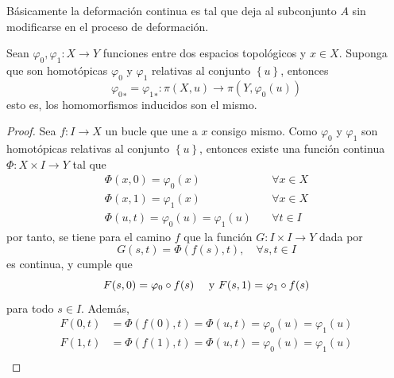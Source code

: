 \documentclass[12pt]{report}
\theoremstyle{largebreak}
\newcommand\cf[3]{\ensuremath{#1:#2\rightarrow#3}}
\begin{document}
    Básicamente la deformación continua es tal que deja al subconjunto $A$ sin modificarse en el proceso de deformación.

    \begin{theor}
        Sean $\cf{\varphi_0,\varphi_1}{X}{Y}$ funciones entre dos espacios topológicos y $x\in X$. Suponga que son homotópicas $\varphi_0$ y $\varphi_1$ relativas al conjunto $\left\{u \right\}$, entonces
        \begin{equation*}
            \cf{{\varphi_0}_*={\varphi_1}_*}{\pi(X,u)}{\pi(Y,\varphi_0(u))}
        \end{equation*}
        esto es, los homomorfismos inducidos son el mismo.
    \end{theor}

    \begin{proof}
        Sea $\cf{f}{I}{X}$ un bucle que une a $x$ consigo mismo. Como $\varphi_0$ y $\varphi_1$ son homotópicas relativas al conjunto $\left\{u\right\}$, entonces existe una función continua $\cf{\Phi}{X\times I}{Y}$ tal que
        \begin{equation*}
            \begin{split}
                \Phi(x,0)=\varphi_0(x) & \quad\forall x\in X\\
                \Phi(x,1)=\varphi_1(x) & \quad\forall x\in X\\
                \Phi(u,t)=\varphi_0(u)=\varphi_1(u) & \quad\forall t\in I
            \end{split}
        \end{equation*}
        por tanto, se tiene para el camino $f$ que la función $\cf{G}{I\times I}{Y}$ dada por
        \begin{equation*}
            G(s,t)=\Phi(f(s),t),\quad\forall s,t\in I
        \end{equation*}
        es continua, y cumple que
        \begin{equation*}
            F(s,0)=\varphi_0\circ f(s)\quad\textup{ y }F(s,1)=\varphi_1\circ f(s)
        \end{equation*}
        para todo $s\in I$. Además,
        \begin{equation*}
            \begin{split}
                F(0,t)&=\Phi(f(0),t)=\Phi(u,t)=\varphi_0(u)=\varphi_1(u)\\
                F(1,t)&=\Phi(f(1),t)=\Phi(u,t)=\varphi_0(u)=\varphi_1(u)\\
            \end{split}
        \end{equation*}

\end{proof}
\end{document}
